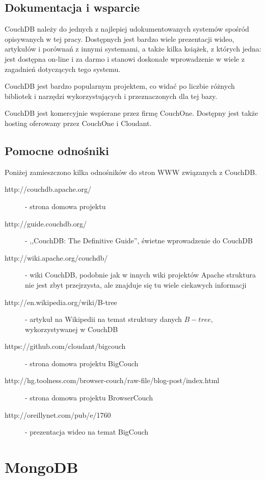 \subsection*{Dokumentacja i wsparcie}

CouchDB należy do jednych z najlepiej udokumentowanych systemów spośród opisywanych w tej pracy.
Dostępnych jest bardzo wiele prezentacji wideo, artykułów i porównań z innymi systemami, a także kilka książek, z których jedna: \cite{couchdb-guide} jest dostępna on-line i za darmo i stanowi doskonałe wprowadzenie w wiele z zagadnień dotyczących tego systemu.

CouchDB jest bardzo popularnym projektem, co widać po liczbie różnych bibliotek i narzędzi wykorzystujących i przeznaczonych dla tej bazy.

CouchDB jest komercyjnie wspierane przez firmę CouchOne.
Dostępny jest także hosting oferowany przez CouchOne i Cloudant.

\subsection*{Pomocne odnośniki}

Poniżej zamieszczono kilka odnośników do stron WWW związanych z CouchDB.

\begin{description}
 \item [http://couchdb.apache.org/] - strona domowa projektu
 \item [http://guide.couchdb.org/] - ,,CouchDB: The Definitive Guide'', świetne wprowadzenie do CouchDB
 \item [http://wiki.apache.org/couchdb/] - wiki CouchDB, podobnie jak w innych wiki projektów Apache struktura nie jest zbyt przejrzysta, ale znajduje się tu wiele ciekawych informacji
 \item [http://en.wikipedia.org/wiki/B-tree] - artykuł na Wikipedii na temat struktury danych $B-tree$, wykorzystywanej w CouchDB 
 \item [https://github.com/cloudant/bigcouch] - strona domowa projektu BigCouch
 \item [http://hg.toolness.com/browser-couch/raw-file/blog-post/index.html] - strona domowa projektu BrowserCouch
 \item [http://oreillynet.com/pub/e/1760] - prezentacja wideo na temat BigCouch
\end{description}

\section{MongoDB}
\label{sec:mongodb}

